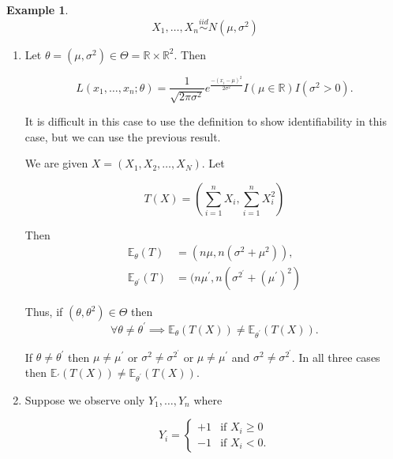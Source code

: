\documentclass[12pt]{article}
\theoremstyle{definition}
\newtheorem*{example}{Example}
\begin{document}
\begin{example}
\begin{equation*}
X_1, \ldots, X_n \overset{iid}{\sim} N(\mu, \sigma^2)
\end{equation*}

\begin{enumerate}[label = Part \arabic*)]

\item 
Let $\theta = (\mu, \sigma^2) \in \Theta = \mathbb{R} \times \mathbb{R}^2$. Then

\begin{equation*}
L(x_1, \ldots, x_n; \theta) = \frac{1}{\sqrt{2 \pi \sigma^2}} 
e^{\frac{-(x_i - \mu)^2}{2\sigma^2}} I(\mu \in \mathbb{R})I(\sigma^2 > 0).
\end{equation*}

It is difficult in this case to use the definition to show identifiability
in this case, but we can use the previous result.

We are given $X = (X_1, X_2, \dots, X_N)$. Let 

\begin{equation*}
T(X) = \left( \sum_{i = 1}^n X_i,  \sum^n_{i = 1} X_i^2 \right)
\end{equation*}

Then 
\begin{align*}
\mathbb{E}_{\theta}(T) &= (n \mu, n(\sigma^2 + \mu^2)),\\
\mathbb{E}_{\theta^{\prime}}(T) &= (n \mu^{\prime}, n(\sigma^{2^{\prime}} + (\mu^{\prime})^2) 
\end{align*}

Thus, if $(\theta, \theta^2) \in \Theta$ then
\begin{equation*}
\forall \theta \neq \theta^{\prime} \implies \mathbb{E}_{\theta}(T(X)) \neq \mathbb{E}_{\theta^{\prime}}(T(X)).
\end{equation*}

If $\theta \neq \theta^{\prime}$ then $\mu \neq \mu^{\prime}$ or 
$\sigma^2 \neq \sigma^{2^{\prime}}$ or $\mu \neq \mu^{\prime}$ and
$\sigma^2 \neq \sigma^{2^{\prime}}$. In all three cases then
$\mathbb{E}_{\prime}(T(X)) \neq \mathbb{E}_{\theta^{\prime}}(T(X))$.

\item Suppose we observe only $Y_1, \ldots, Y_n$ where

\begin{equation*}
Y_i =
\begin{cases}
+1 & \text{if } X_i \geq 0 \\
-1 & \text{if } X_i < 0.
\end{cases}
\end{equation*}


\end{enumerate}
\end{example}
\end{document}

